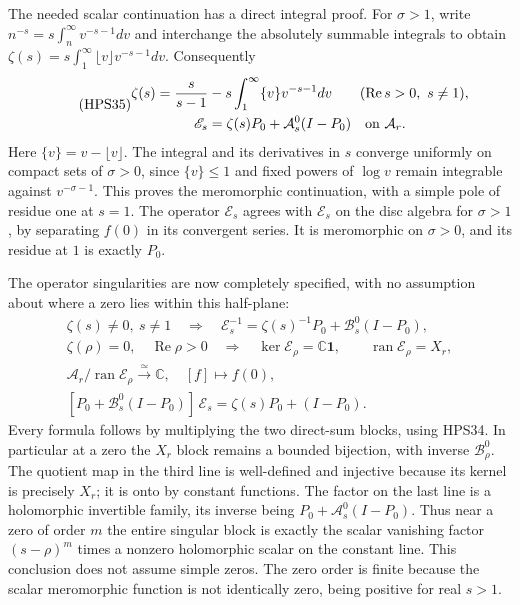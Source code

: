 The needed scalar continuation has a
direct integral proof. For $\sigma>1$,
write $n^{-s}=s\int_n^\infty v^{-s-1}dv$
and interchange the absolutely summable
integrals to obtain
$\zeta(s)=s\int_1^\infty\lfloor v\rfloor
v^{-s-1}dv$. Consequently
\begin{equation}\tag{HPS35}
\begin{gathered}
 \zeta(s)=\frac{s}{s-1}
       -s\int_1^\infty\{v\}v^{-s-1}dv
                    \qquad(\operatorname{Re}s>0,\ s\ne1),\\
 \mathscr E_s
       =\zeta(s)P_0+\mathcal A_s^0(I-P_0)
                            \quad\hbox{on }\mathcal A_r.
\end{gathered}
\end{equation}
Here $\{v\}=v-\lfloor v\rfloor$.
The integral and its derivatives in $s$
converge uniformly on compact sets of
$\sigma>0$, since $\{v\}\le1$ and
fixed powers of $\log v$ remain
integrable against $v^{-\sigma-1}$.
This proves the meromorphic continuation,
with a simple pole of residue one at
$s=1$. The operator $\mathscr E_s$
agrees with $\mathcal E_s$ on the
disc algebra for $\sigma>1$, by
separating $f(0)$ in its convergent
series. It is meromorphic on $\sigma>0$,
and its residue at $1$ is exactly $P_0$.

The operator singularities are now completely
specified, with no assumption about where
a zero lies within this half-plane:
\begin{equation}\tag{HPS36}
\begin{gathered}
 \zeta(s)\ne0,\ s\ne1\quad\Longrightarrow\quad
 \mathscr E_s^{-1}
      =\zeta(s)^{-1}P_0+\mathcal B_s^0(I-P_0),\\
 \zeta(\rho)=0,\quad\operatorname{Re}\rho>0
 \quad\Longrightarrow\quad
 \ker\mathscr E_\rho=\mathbb C\mathbf1,\qquad
 \operatorname{ran}\mathscr E_\rho=X_r,\\
 \mathcal A_r/\operatorname{ran}\mathscr E_\rho
       \xrightarrow{\ \simeq\ }\mathbb C,\quad
                      [f]\longmapsto f(0),\\
 [P_0+\mathcal B_s^0(I-P_0)]\,\mathscr E_s
                   =\zeta(s)P_0+(I-P_0).
\end{gathered}
\end{equation}
Every formula follows by multiplying
the two direct-sum blocks, using HPS34.
In particular at a zero the $X_r$
block remains a bounded bijection,
with inverse $\mathcal B_\rho^0$.
The quotient map in the third line
is well-defined and injective because
its kernel is precisely $X_r$; it
is onto by constant functions.
The factor on the last line is a
holomorphic invertible family, its
inverse being $P_0+\mathcal A_s^0(I-P_0)$.
Thus near a zero of order $m$ the
entire singular block is exactly
the scalar vanishing factor
$(s-\rho)^m$ times a nonzero
holomorphic scalar on the constant
line. This conclusion does not
assume simple zeros.
The zero order is finite because
the scalar meromorphic function is
not identically zero, being positive
for real $s>1$.

